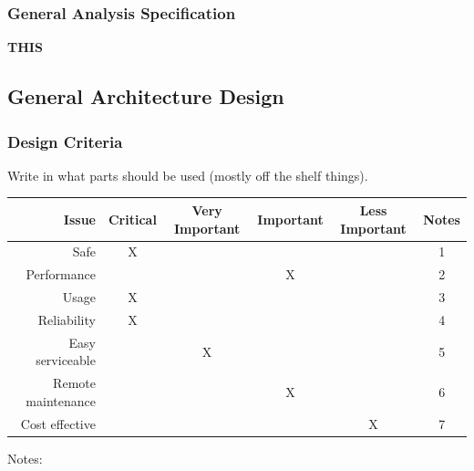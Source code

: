 	\subsubsection{General Analysis Specification}
		 \textbf{THIS}
\subsection{General Architecture Design}
	\subsubsection{Design Criteria}
		Write in what parts should be used (mostly off the shelf things).
				\begin{table}[h!]
					\begin{tabular}{| r | c | c | c | c | c |}
					\hline
					Issue & Critical & Very Important & Important & Less Important & Notes \\ \hline
					Safe					& X & ~ & ~ & ~ & 1 \\ \hline
					Performance 			& ~ & ~ & X & ~ & 2 \\ \hline
					Usage 				& X & ~ & ~ & ~ & 3 \\ \hline
					Reliability 			& X & ~ & ~ & ~ & 4 \\ \hline
					Easy serviceable 		& ~ & X & ~ & ~ & 5 \\ \hline
					Remote maintenance 	& ~ & ~ & X & ~ & 6 \\ \hline
					Cost effective 			& ~ & ~ & ~ & X & 7 \\ \hline
					\end{tabular}
				\end{table}
			Notes:

